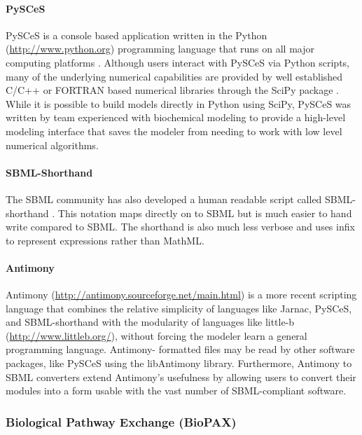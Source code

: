 \documentclass[]{article}
\begin{document}
\paragraph{PySCeS}

PySCeS is a console based application written in the Python
(\url{http://www.python.org}) programming language that runs on all
major computing platforms \autocite{Pysces2004}. Although users interact
with PySCeS via Python scripts, many of the underlying numerical
capabilities are provided by well established C/C++ or FORTRAN based
numerical libraries through the SciPy package
\autocite{olivier2002modelling}. While it is possible to build models
directly in Python using SciPy, PySCeS was written by team experienced
with biochemical modeling to provide a high-level modeling interface
that saves the modeler from needing to work with low level numerical
algorithms.

\paragraph{SBML-Shorthand}

The SBML community has also developed a human readable script called
SBML- shorthand \autocite{gillespie2006tools}. This notation maps
directly on to SBML but is much easier to hand write compared to SBML.
The shorthand is also much less verbose and uses infix to represent
expressions rather than MathML.

\paragraph{Antimony}

Antimony (\url{http://antimony.sourceforge.net/main.html})
\autocite{smith2009antimony} is a more recent scripting language that
combines the relative simplicity of languages like Jarnac, PySCeS, and
SBML-shorthand with the modularity of languages like little-b
(\url{http://www.littleb.org/}), without forcing the modeler learn a
general programming language. Antimony- formatted files may be read by
other software packages, like PySCeS using the libAntimony library.
Furthermore, Antimony to SBML converters extend Antimony's usefulness by
allowing users to convert their modules into a form usable with the vast
number of SBML-compliant software.

\subsubsection{Biological Pathway Exchange (BioPAX)}
\end{document}
